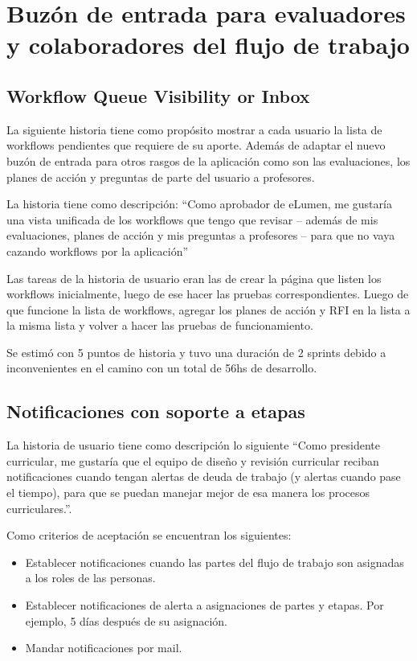 \section{Buzón de entrada para evaluadores y colaboradores del flujo de trabajo}
\subsection{Workflow Queue Visibility or Inbox}
La siguiente historia tiene como propósito mostrar a cada usuario la lista de workflows pendientes que requiere de su aporte. Además de adaptar el nuevo buzón de entrada para otros rasgos de la aplicación como son las evaluaciones, los planes de acción y preguntas de parte del usuario a profesores.

La historia tiene como descripción: “Como aprobador de eLumen, me gustaría una vista unificada de los workflows que tengo que revisar – además de mis evaluaciones, planes de acción y mis preguntas a profesores – para que no vaya cazando workflows por la aplicación”

Las tareas de la historia de usuario eran las de crear la página que listen los workflows inicialmente, luego de ese hacer las pruebas correspondientes. Luego de que funcione la lista de workflows, agregar los planes de acción y RFI en la lista a la misma lista y volver a hacer las pruebas de funcionamiento. 

Se estimó con 5 puntos de historia y tuvo una duración de 2 sprints debido a inconvenientes en el camino con un total de 56hs de desarrollo.

\subsection{Notificaciones con soporte a etapas}
La historia de usuario tiene como descripción lo siguiente \enquote{Como presidente curricular, me gustaría que el equipo de diseño y revisión curricular reciban notificaciones cuando tengan alertas de deuda de trabajo (y alertas cuando pase el tiempo), para que se puedan manejar mejor de esa manera los procesos curriculares.}.

Como criterios de aceptación se encuentran los siguientes:
\begin{itemize}
	\item Establecer notificaciones cuando las partes del flujo de trabajo son asignadas a los roles de las personas.
	\item Establecer notificaciones de alerta a asignaciones de partes y etapas. Por ejemplo, 5 días después de su asignación.
	\item Mandar notificaciones por mail.
\end{itemize}

